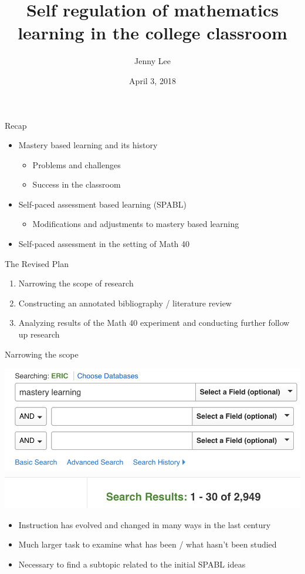 \documentclass{beamer}
\title{Self regulation of mathematics learning in the college classroom}
\date{April 3, 2018}
\author{Jenny Lee}
\institute{Harvey Mudd College\\Advisor: Dagan Karp}
\begin{document}
\maketitle
\begin{frame}{Recap}
  \begin{itemize}
    \item Mastery based learning and its history
    \begin{itemize}
      \item Problems and challenges
      \item Success in the classroom
    \end{itemize}
    \item Self-paced assessment based learning (SPABL)
    \begin{itemize}
      \item Modifications and adjustments to mastery based learning
    \end{itemize}
    \item Self-paced assessment in the setting of Math 40
  \end{itemize}
\end{frame}
\begin{frame}{The Revised Plan}
  \begin{enumerate}
    \item Narrowing the scope of research
    \item Constructing an annotated bibliography / literature review
    \item Analyzing results of the Math 40 experiment and conducting further follow up research
  \end{enumerate}
\end{frame}
\begin{frame}{Narrowing the scope}
  \begin{center}
    \includegraphics[scale=0.3]{ericsearch}
  \end{center}
  \begin{itemize}
    \item Instruction has evolved and changed in many ways in the last century
    \item Much larger task to examine what has been / what hasn't been studied
    \item Necessary to find a subtopic related to the initial SPABL ideas
  \end{itemize}
\end{frame}
\end{document}
